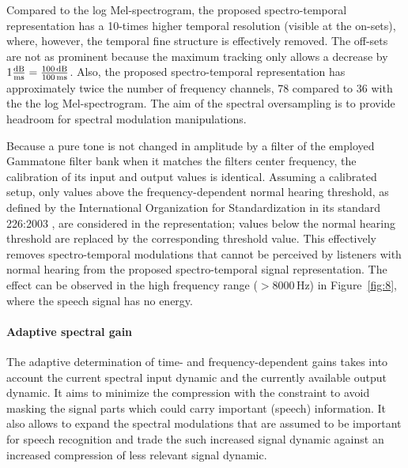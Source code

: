 \documentclass[10pt,a4paper,twocolumn]{article}
\begin{document}
%
Compared to the log Mel-spectrogram, the proposed spectro-temporal representation has a 10-times higher temporal resolution (visible at the on-sets), where, however, the temporal fine structure is effectively removed.
%
The off-sets are not as prominent because the maximum tracking only allows a decrease by $1\frac{\text{dB}}{\text{ms}} = \frac{\text{100\,dB}}{\text{100\,ms}}$.
%
Also, the proposed spectro-temporal representation has approximately twice the number of frequency channels, 78 compared to 36 with the the log Mel-spectrogram.
%
The aim of the spectral oversampling is to provide headroom for spectral modulation manipulations.

Because a pure tone is not changed in amplitude by a filter of the employed Gammatone filter bank when it matches the filters center frequency, the calibration of its input and output values is identical.
%
Assuming a calibrated setup, only values above the frequency-dependent normal hearing threshold, as defined by the International Organization for Standardization in its standard 226:2003 \citep{iso2003}, are considered in the representation; values below the normal hearing threshold are replaced by the corresponding threshold value.
%
This effectively removes spectro-temporal modulations that cannot be perceived by listeners with normal hearing from the proposed spectro-temporal signal representation.
%
The effect can be observed in the high frequency range ($>8000$\,Hz) in Figure~\ref{fig:8}, where the speech signal has no energy.

\paragraph{Adaptive spectral gain}
%
The adaptive determination of time- and frequency-dependent gains takes into account the current spectral input dynamic and the currently available output dynamic.
%
It aims to minimize the compression with the constraint to avoid masking the signal parts which could carry important (speech) information.
%
It also allows to expand the spectral modulations that are assumed to be important for speech recognition and trade the such increased signal dynamic against an increased compression of less relevant signal dynamic.
\end{document}
